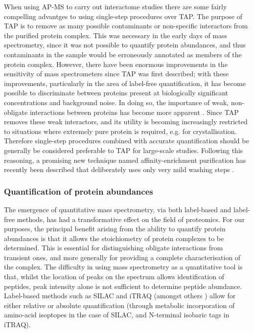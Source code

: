 \documentclass[a4paper,11pt,twoside,openright]{scrbook}
\begin{document}
When using AP-MS to carry out interactome studies there are some fairly compelling advantges to using single-step procedures over TAP. The purpose of TAP is to remove as many possible contaminants or non-specific interactors from the purified protein complex. This was necessary in the early days of mass spectrometry, since it was not possible to quantify protein abundances, and thus contaminants in the sample would be erroneously annotated as members of the protein complex. However, there have been enormous improvements in the sensitivity of mass spectrometers since TAP was first described; with these improvements, particularly in the area of label-free quantification, it has become possible to discriminate between proteins present at biologically significant concentrations and background noise. In doing so, the importance of weak, non-obligate interactions between proteins has become more apparent \cite{Perkins2010a,Hein2015}. Since TAP removes these weak interactors, and its utility is becoming increasingly restricted to situations where extremely pure protein is required, e.g. for crystallisation. Therefore single-step procedures combined with accurate quantification should be generally be considered preferable to TAP for large-scale studies. Following this reasoning, a promising new technique named affinity-enrichment purification has recently been described that deliberately uses only very mild washing steps \cite{Keilhauer2015}.

\subsubsection{Quantification of protein abundances}
The emergence of quantitative mass spectrometry, via both label-based and label-free methods, has had a transformative effect on the field of proteomics. For our purposes, the principal benefit arising from the ability to quantify protein abundances is that it allows the stoichiometry of protein complexes to be determined. This is essential for distinguishing obligate interactions from transient ones, and more generally for providing a complete characterisation of the complex. The difficulty in using mass spectrometry as a quantitative tool is that, whilst the location of peaks on the spectrum allows identification of peptides, peak intensity alone is not sufficient to determine peptide abundance. Label-based methods such as SILAC \cite{Ong2002a} and iTRAQ \cite{Ross2004} (amongst others \cite{Gygi1999,Thompson2003}) allow for either relative or absolute quantification (through metabolic incorporation of amino-acid isoptopes in the case of SILAC, and N-terminal isobaric tags in iTRAQ).
\end{document}
